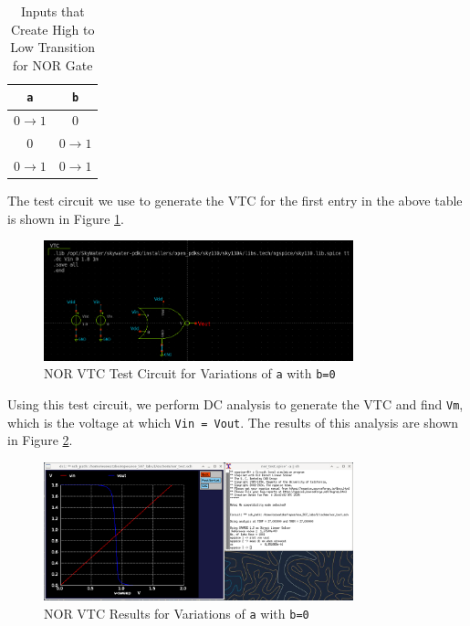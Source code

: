 \documentclass[fleqn]{article}
\begin{document}
	\begin{table}[H]
	\begin{center}
	\caption{Inputs that Create High to Low Transition for NOR Gate}
	\label{table::nor_gate_high_to_low_transitions}
	\begin{tabular}{| c | c |}
		\hline
		\texttt{a} & \texttt{b} \\
		\hline	
		$0 \rightarrow 1$ & $0$\\
		\hline	
		$0$ & $0 \rightarrow 1$\\
		\hline	
		$0 \rightarrow 1$ & $0 \rightarrow 1$\\
		\hline
	\end{tabular}
	\end{center}
	\end{table}
	
	\noindent The test circuit we use to generate the VTC for the first entry in the above table is shown in Figure \ref{fig::nor_vtc_test_sweep_va}.
	
	\begin{figure}[H]
		\centerline{\includegraphics[width=0.8\textwidth]{nor_vtc_test_sweep_va.png}}
		\caption{NOR VTC Test Circuit for Variations of \texttt{a} with \texttt{b=0}}
		\label{fig::nor_vtc_test_sweep_va}
	\end{figure}	
	
	\noindent Using this test circuit, we perform DC analysis to generate the VTC and find \texttt{Vm}, which is the voltage at which \texttt{Vin = Vout}. The results of this analysis are shown in Figure \ref{fig::nor_vtc_sweep_va}.
	
	\begin{figure}[H]
		\centerline{\includegraphics[width=0.8\textwidth]{nor_vtc_sweep_va.png}}
		\caption{NOR VTC Results for Variations of \texttt{a} with \texttt{b=0}}
		\label{fig::nor_vtc_sweep_va}
	\end{figure}
	
\end{document}
